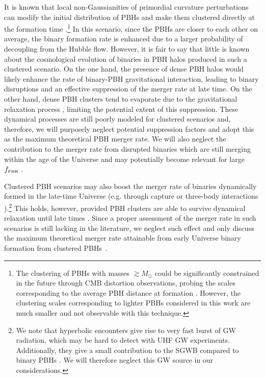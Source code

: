 \documentclass[11pt,a4paper]{article}
\begin{document}
It is known that local non-Gaussianities of primordial curvature perturbations can modify the initial distribution of PBHs and make them clustered directly at the formation time \cite{Tada:2015noa,Young:2015kda,Young:2019gfc,Atal:2020igj,DeLuca:2021hcf}.\footnote{The clustering of PBHs with masses $\gtrsim M_\odot$ could be significantly constrained in the future through CMB distortion observations, probing the scales corresponding to the average PBH distance at formation \cite{DeLuca:2021hcf}. 
However, the clustering scales corresponding to lighter PBHs considered in this work are much smaller and not observable with this technique.} 
%
In this scenario, since the PBHs are closer to each other on average, the binary formation rate is enhanced due to a larger probability of decoupling from the Hubble flow. 
However, it is fair to say that little is known about the cosmological evolution of binaries in PBH halos produced in such a clustered scenario. On the one hand, the presence of dense PBH halos would likely enhance the rate of binary-PBH gravitational interaction, leading to binary disruptions and an effective suppression of the merger rate at late time. On the other hand, dense PBH clusters tend to evaporate due to the gravitational relaxation process \cite{binn,DeLuca:2020jug}, limiting the potential extent of this suppression. These dynamical processes are still poorly modeled for clustered scenarios and, therefore, we will purposely neglect potential suppression factors and adopt this as the maximum theoretical PBH merger rate. 
We will also neglect the contribution to the merger rate from disrupted binaries which are still merging within the age of the Universe and may potentially become relevant for large $f_\text{\tiny PBH}$ \cite{Vaskonen:2019jpv}. 

Clustered PBH scenarios may also boost the merger rate of binaries dynamically formed in the late-time Universe (e.g. through capture \cite{1989ApJ...343..725Q,Mouri:2002mc} or three-body interactions \cite{Ivanova:2005mi,2010ApJ...717..948I,Rodriguez:2021qhl,Kritos:2020wcl}).\footnote{We note that hyperbolic encounters \cite{Garcia-Bellido:2017knh,Garcia-Bellido:2021jlq,Morras:2021atg} give rise to very fast burst of GW radiation, which may be hard to detect with UHF GW experiments. Additionally, they give a small contribution to the SGWB compared to binary PBHs \cite{Garcia-Bellido:2021jlq}. We will therefore neglect this GW source in our considerations. }
This holds, however, provided PBH clusters are able to survive dynamical relaxation until late times \cite{binn}.
Since a proper assessment of the merger rate in such scenarios is still lacking in the literature, 
we neglect such effect and only discuss the maximum theoretical merger rate attainable from early Universe binary formation from clustered PBHs~\cite{Raidal:2017mfl}.
\end{document}
